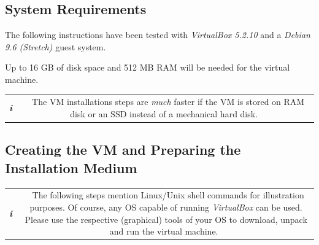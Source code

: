 \documentclass[12pt,english,parskip=half]{scrreprt}
\newcommand{\infobox}[1]{
  \hfill
  \setlength\arrayrulewidth{1pt}
  \begin{tabular}[t]{c|c|}
    \parbox{1.8em}{\hfill\textit{\Huge\textbf{i}\,}}
    &
    \,\parbox{0.89\linewidth}{\setlength{\parskip}{0.5em}#1}\,
  \end{tabular}
  \par
}
\begin{document}
\subsection{System Requirements}
\label{sec:tutorial-vm-requirements}


The following instructions have been tested with \textit{VirtualBox 5.2.10} and a
\textit{Debian 9.6 (Stretch)} guest system.

Up to 16 GB of disk space and 512 MB RAM will be needed for the virtual machine.

\infobox{
  The VM installations steps are \emph{much} faster if the VM
  is stored on RAM disk or an SSD instead of a mechanical hard disk.
}



\subsection{Creating the VM and Preparing the Installation Medium}
\label{sec:tutorial-vm-create}


\infobox{
  The following steps mention Linux/Unix shell commands for illustration purposes.
  Of course, any OS capable of running \textit{VirtualBox} can be used.
  Please use the respective (graphical) tools of your OS to download, unpack and
  run the virtual machine.
}
\end{document}
